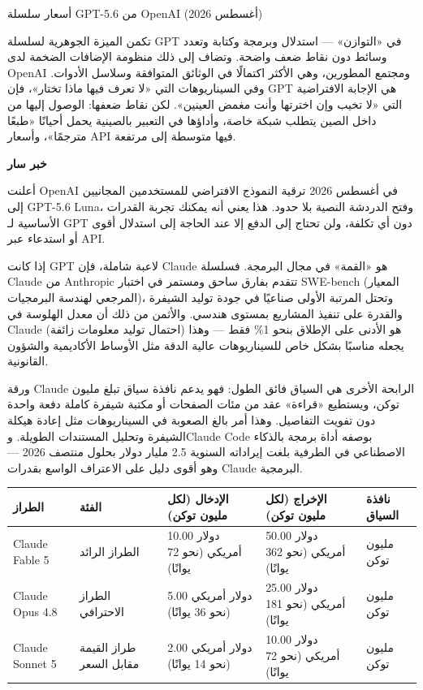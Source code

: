 \begin{center}\small\color{gray}أسعار سلسلة GPT-5.6 من OpenAI (أغسطس 2026)\end{center}

تكمن الميزة الجوهرية لسلسلة GPT في «التوازن» — استدلال وبرمجة وكتابة وتعدد وسائط دون نقاط ضعف واضحة. وتضاف إلى ذلك منظومة الإضافات الضخمة لدى OpenAI ومجتمع المطورين، وهي الأكثر اكتمالًا في الوثائق المتوافقة وسلاسل الأدوات. وفي السيناريوهات التي «لا تعرف فيها ماذا تختار»، فإن GPT هي الإجابة الافتراضية التي «لا تخيب وإن اخترتها وأنت مغمض العينين». لكن نقاط ضعفها: الوصول إليها من داخل الصين يتطلب شبكة خاصة، وأداؤها في التعبير بالصينية يحمل أحيانًا «طبعًا مترجمًا»، وأسعار API فيها متوسطة إلى مرتفعة.

\textbf{خبر سار}\par

أعلنت OpenAI في أغسطس 2026 ترقية النموذج الافتراضي للمستخدمين المجانيين إلى GPT-5.6 Luna، وفتح الدردشة النصية بلا حدود. هذا يعني أنه يمكنك تجربة القدرات الأساسية لـ GPT دون أي تكلفة، ولن تحتاج إلى الدفع إلا عند الحاجة إلى استدلال أقوى أو استدعاء عبر API.


إذا كانت GPT لاعبة شاملة، فإن Claude هو «القمة» في مجال البرمجة. فسلسلة Claude من Anthropic تتقدم بفارق ساحق ومستمر في اختبار SWE-bench (المعيار المرجعي لهندسة البرمجيات)، وتحتل المرتبة الأولى صناعيًا في جودة توليد الشيفرة والقدرة على تنفيذ المشاريع بمستوى هندسي. والأثمن من ذلك أن معدل الهلوسة في Claude (احتمال توليد معلومات زائفة) هو الأدنى على الإطلاق بنحو 1\% فقط — وهذا يجعله مناسبًا بشكل خاص للسيناريوهات عالية الدقة مثل الأوساط الأكاديمية والشؤون القانونية.

ورقة Claude الرابحة الأخرى هي السياق فائق الطول: فهو يدعم نافذة سياق تبلغ مليون توكن، ويستطيع «قراءة» عقد من مئات الصفحات أو مكتبة شيفرة كاملة دفعة واحدة دون تفويت التفاصيل. وهذا أمر بالغ الصعوبة في السيناريوهات مثل إعادة هيكلة الشيفرة وتحليل المستندات الطويلة. وClaude Code بوصفه أداة برمجة بالذكاء الاصطناعي في الطرفية بلغت إيراداته السنوية 2.5 مليار دولار بحلول منتصف 2026 — وهو أقوى دليل على الاعتراف الواسع بقدرات Claude البرمجية.

\begin{center}
\begin{tabularx}{\linewidth}{|X|X|X|X|X|}
\hline
\textbf{الطراز} & \textbf{الفئة} & \textbf{الإدخال (لكل مليون توكن)} & \textbf{الإخراج (لكل مليون توكن)} & \textbf{نافذة السياق} \tabularnewline
\hline
Claude Fable 5 & الطراز الرائد & 10.00 دولار أمريكي (نحو 72 يوانًا) & 50.00 دولار أمريكي (نحو 362 يوانًا) & مليون توكن \tabularnewline
Claude Opus 4.8 & الطراز الاحترافي & 5.00 دولار أمريكي (نحو 36 يوانًا) & 25.00 دولار أمريكي (نحو 181 يوانًا) & مليون توكن \tabularnewline
Claude Sonnet 5 & طراز القيمة مقابل السعر & 2.00 دولار أمريكي (نحو 14 يوانًا) & 10.00 دولار أمريكي (نحو 72 يوانًا) & مليون توكن \tabularnewline
\hline
\end{tabularx}
\end{center}

